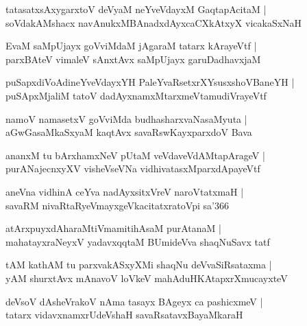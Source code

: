 \documentclass[twoside,12pt,openright]{book}
\newcounter{shloka}[chapter]
\begin{document}
\begin{shloka}%
tatasatxsAxygarxtoV deVyaM neYveVdayxM GaqtapAcitaM |\\
soVdakAMshacx navAnukxMBAnadxdAyxcaCXkAtxyX vicakaSxNaH 
\end{shloka}

\begin{shloka}%
EvaM saMpUjayx goVviMdaM jAgaraM tatarx kArayeVtf |\\
parxBAteV vimaleV sAnxtAvx saMpUjayx garuDadhavxjaM 
\end{shloka}

\begin{shloka}%
puSapxdiVoAdineYveVdayxYH PaleYvaRsetxrXYsusxshoVBaneYH |\\
puSApxMjaliM tatoV dadAyxnamxMtarxmeVtamudiVrayeVtf
\end{shloka}

\begin{shloka}%
namoV namasetxV goVviMda budhasharxvaNasaMyuta |\\
aGwGasaMkaSxyaM kaqtAvx savaRswKayxparxdoV Bava
\end{shloka}

\begin{shloka}%
ananxM tu bArxhamxNeV pUtaM veVdaveVdAMtapArageV |\\
purANajecnxyXV visheVseVNa vidhivatasxMparxdApayeVtf
\end{shloka}

\begin{shloka}%
aneVna vidhinA ceYva nadAyxsitxVreV naroVtatxmaH |\\
savaRM nivaRtaRyeVmayxgeVkacitatxratoVpi sa\char'366
\end{shloka}

\begin{shloka}%
atArxpuyxdAharaMtiVmamitihAsaM purAtanaM |\\
mahatayxraNeyxV yadavxqqtaM BUmideVva shaqNuSavx tatf
\end{shloka}

\begin{shloka}%
tAM kathAM tu parxvakASxyXMi shaqNu deVvaSiRsataxma |\\
yAM shurxtAvx mAnavoV loVkeV mahAduHKAtapxrXmucayxteV 
\end{shloka}

\begin{shloka}%
deVsoV dAsheVrakoV nAma tasayx BAgeyx ca pashicxmeV |\\
tatarx vidavxnamxrUdeVshaH savaRsatavxBayaMkaraH 
\end{shloka}
\end{document}
